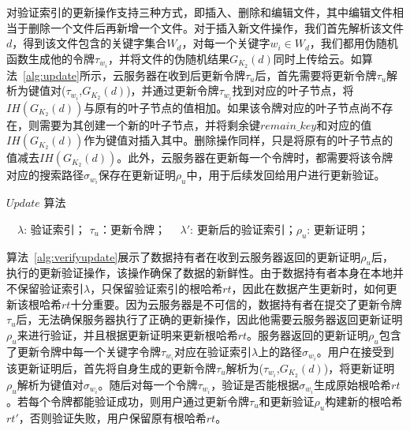 对验证索引的更新操作支持三种方式，即插入、删除和编辑文件，其中编辑文件相当于删除一个文件后再新增一个文件。对于插入新文件操作，我们首先解析该文件$d$，得到该文件包含的关键字集合$W_d$，对每一个关键字$w_i \in W_d$，我们都用伪随机函数生成他的令牌$\tau_{w_i }$，并将文件的伪随机结果$G_{K_2}(d)$同时上传给云。如算法~\ref{alg:update}所示，云服务器在收到后更新令牌$\tau_u$后，首先需要将更新令牌$\tau_u$解析为键值对($\tau_{w_i}$,$G_{K_2}(d)$)，并通过更新令牌$\tau_{w_i}$找到对应的叶子节点，将$IH(G_{K_2}(d))$与原有的叶子节点的值相加。如果该令牌对应的叶子节点尚不存在，则需要为其创建一个新的叶子节点，并将剩余键$remain\_key$和对应的值$IH(G_{K_2}(d))$作为键值对插入其中。删除操作同样，只是将原有的叶子节点的值减去$IH(G_{K_2}(d))$。此外，云服务器在更新每一个令牌时，都需要将该令牌对应的搜索路径$\sigma_{w_i}$保存在更新证明$\rho_u$中，用于后续发回给用户进行更新验证。


\begin{algorithm}[ht]
  \caption{$Update$ 算法}
  \label{alg:update}
  \begin{algorithmic}[1]
    \REQUIRE ~~{$\lambda$: 验证索引； $\tau_u$：更新令牌；}
    \ENSURE ~~{$\lambda'$: 更新后的验证索引；$\rho_u$: 更新证明；}
                \ENDIF
              \ENDFOR
  \end{algorithmic}
\end{algorithm}



算法~\ref{alg:verifyupdate}展示了数据持有者在收到云服务器返回的更新证明$\rho_u$后，执行的更新验证操作，该操作确保了数据的新鲜性。由于数据持有者本身在本地并不保留验证索引$\lambda$，只保留验证索引的根哈希$rt$，因此在数据产生更新时，如何更新该根哈希$rt$十分重要。因为云服务器是不可信的，数据持有者在提交了更新令牌$\tau_u$后，无法确保服务器执行了正确的更新操作，因此他需要云服务器返回更新证明$\rho_u$来进行验证，并且根据更新证明来更新根哈希$rt$。服务器返回的更新证明$\rho_u$包含了更新令牌中每一个关键字令牌$\tau_{w_i}$对应在验证索引$\lambda$上的路径$\sigma_{w_i}$。用户在接受到该更新证明后，首先将自身生成的更新令牌$\tau_u$解析为($\tau_{w_i}$,$G_{K_2}(d)$)，将更新证明$\rho_u$解析为键值对$\sigma_{w_i}$。随后对每一个令牌$\tau_{w_i}$，验证是否能根据$\sigma_{w_i}$生成原始根哈希$rt$。若每个令牌都能验证成功，则用户通过更新令牌$\tau_u$和更新验证$\rho_u$构建新的根哈希$rt'$，否则验证失败，用户保留原有根哈希$rt$。


